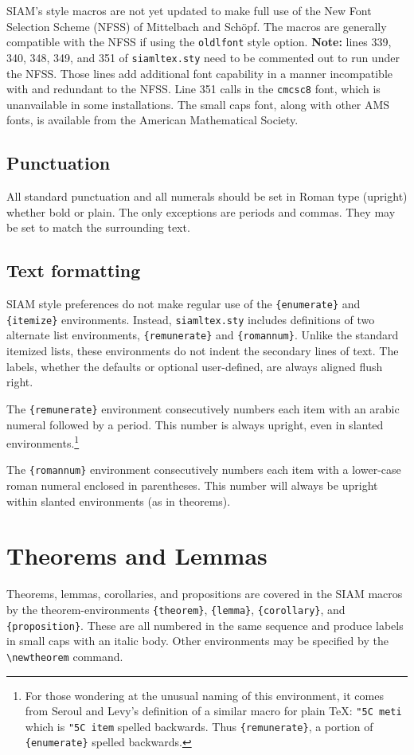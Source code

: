 SIAM's style macros are not yet updated to make full use of the New
Font Selection Scheme (NFSS) of Mittelbach and Sch\"opf. The macros
are generally compatible with the NFSS if using the {\tt oldlfont}
style option. {\bf Note:} lines 339, 340, 348, 349, and 351 of
{\tt siamltex.sty} need to be commented out to run under the
NFSS. Those lines add additional font capability in a manner
incompatible with and redundant to the NFSS. Line 351 calls
in the {\tt cmcsc8} font, which is unanvailable in some installations.
The small caps font, along with other AMS fonts, is available from the 
American Mathematical Society.


\subsection{Punctuation}
All standard punctuation and all numerals should be set in Roman type
(upright) whether bold or plain. The only exceptions are periods and 
commas. They may be set to match the surrounding text.

\subsection{Text formatting}

SIAM style preferences do not make regular use of the \verb|{enumerate}|
and \verb|{itemize}| environments. Instead,
{\tt siamltex.sty} includes definitions of two alternate list
environments, \verb|{remunerate}| and \verb|{romannum}|.
Unlike the standard itemized lists, these environments do
not indent the secondary lines of text. The labels, whether
the defaults or optional user-defined, are always aligned
flush right.

The \verb|{remunerate}| environment consecutively numbers
each item with an arabic numeral followed by a period. This
number is always upright, even in slanted
environments.\footnote{For those wondering at the unusual
naming of this environment, it comes from Seroul and Levy's
\cite{SerLev} definition of a similar macro for plain \TeX: 
{\tt \char"5C meti} which is {\tt \char"5C item} spelled backwards. Thus
\verb|{remunerate}|, a portion of \verb|{enumerate}|
spelled backwards.}

The \verb|{romannum}| environment consecutively numbers
each item with a lower-case roman numeral enclosed in
parentheses. This number will always be upright within
slanted environments (as in theorems).


\section{Theorems and Lemmas}
Theorems, lemmas, corollaries, and propositions are covered
in the SIAM macros by the theorem-environments
\verb|{theorem}|, \verb|{lemma}|, \verb|{corollary}|, and
\verb|{proposition}|. These are all numbered in the same
sequence and produce labels in small caps with an italic
body. Other environments may be specified by the
\verb|\newtheorem| command.

